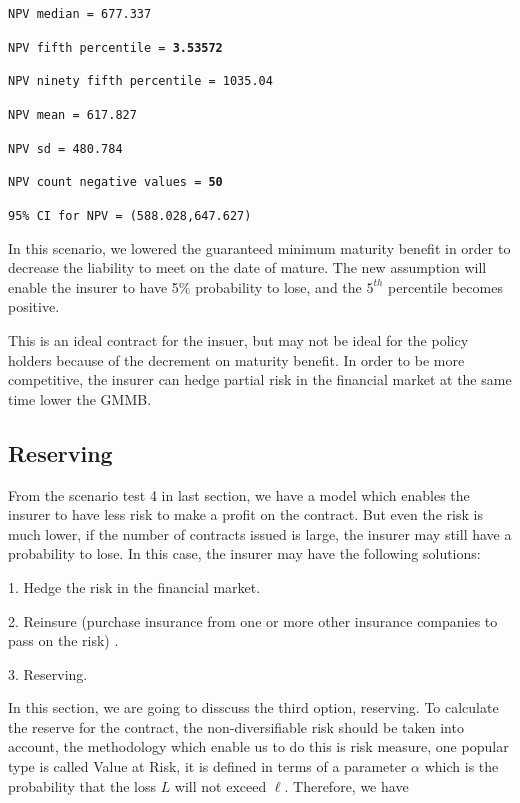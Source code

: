 \documentclass{report}
\begin{document}
\texttt{NPV median = 677.337}

{\renewcommand\baselinestretch{1}\selectfont

\texttt{NPV fifth percentile = \textbf{3.53572}}

\texttt{NPV ninety fifth percentile = 1035.04}

\texttt{NPV mean = 617.827}

\texttt{NPV sd = 480.784}

\texttt{NPV count negative values = \textbf{50}}

\texttt{95\% CI for NPV = (588.028,647.627)}
\par}

In this scenario, we lowered the guaranteed minimum maturity benefit in order to decrease the liability to meet on the date of mature. The new assumption will enable the insurer to have 5\% probability to lose, and the $5^{th}$ percentile becomes positive. 

This is an ideal contract for the insuer, but may not be ideal for the policy holders because of the decrement on maturity benefit. In order to be more competitive, the insurer can hedge partial risk in the financial market at the same time lower the  GMMB.


\subsection{Reserving}


From the scenario test 4 in last section, we have a model which enables the insurer to have less risk to make a profit on the contract. But even the risk is much lower, if the number of contracts issued is large, the insurer may still have a probability to lose. In this case, the insurer may have the following solutions\cite{bib:reserve}:

1. Hedge the risk in the financial market.

2. Reinsure (purchase insurance from one or more other insurance companies to pass on the risk) \cite{bib:reserve-wiki}.

3. Reserving.

In this section, we are going to disscuss the third option, reserving. To calculate the reserve for the contract, the non-diversifiable risk should be taken into account, the methodology which enable us to do this is risk measure\cite{bib:VaR}, one popular type is called Value at Risk, it is defined in terms of a parameter $\alpha$ which is the probability that the loss $L$ will not exceed $\ell$. Therefore, we have
\end{document}
